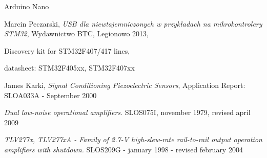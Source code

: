 \begin{thebibliography}{99}



 Arduino Nano

 Marcin Peczarski, 
  \textit{USB dla niewtajemniczonych w przykładach na mikrokontrolery STM32}, Wydawnictwo BTC, Legionowo 2013,

 Discovery kit for STM32F407/417 lines,

   datasheet: STM32F405xx, STM32F407xx 
  
   James Karki, \textit{Signal Conditioning Piezoelectric Sensors}, 
  Application Report: SLOA033A - September 2000

   \textit{Dual low-noise operational amplifiers}. SLOS075I, november 1979, revised april 2009

   \textit{TLV277x, TLV277xA - Family of 2.7-V high-slew-rate rail-to-rail output operation amplifiers with shutdown.}
  SLOS209G - january 1998 - revised february 2004

\end{thebibliography}

